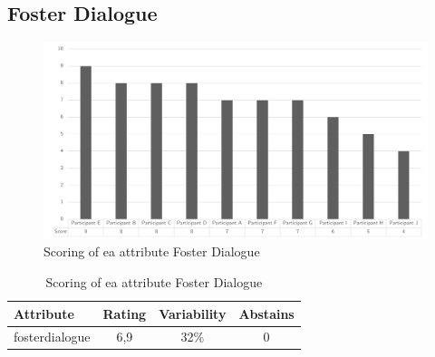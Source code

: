 \subsection{Foster Dialogue}
\begin{figure}[H]
	\centering
	\includegraphics[width=0.9\linewidth]{images/scoreeafosterdialogue}
	\caption[Scoring of \gls{ea} attribute Foster Dialogue]{Scoring of \gls{ea} attribute Foster Dialogue}
	\label{fig:appscoringeafosterdialogue}
\end{figure}
\begin{table}[H]
	\centering
	\begin{tabular}{p{}ccc}
		\toprule
		\textbf{Attribute} & \textbf{Rating} & \textbf{Variability} & \textbf{Abstains} \\
		\midrule
		\Gls{fosterdialogue} & 6,9 & 32\% & 0 \\%
		\bottomrule
	\end{tabular}%
	\caption[Scoring of \gls{ea} attribute Foster Dialogue]{Scoring of \gls{ea} attribute Foster Dialogue}
	\label{tab:appscoringeafosterdialogue}%
\end{table}%
\newpage
